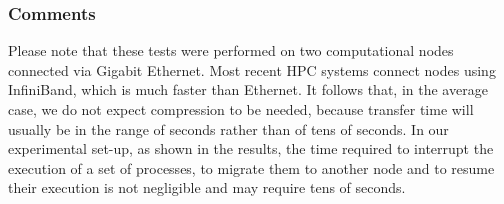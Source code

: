 \subsubsection{Comments}
Please note that these tests were performed on two computational nodes connected
via Gigabit Ethernet. Most recent HPC systems connect nodes using InfiniBand,
which is much faster than Ethernet. It follows that, in the average case, we do
not expect compression to be needed, because transfer time will usually be in
the range of seconds rather than of tens of seconds. In our experimental set-up,
as shown in the results, the time required to interrupt the execution of a set
of processes, to migrate them to another node and to resume their execution is
not negligible and may require tens of seconds.

\begin{figure}[t]
\centering


\end{figure}
